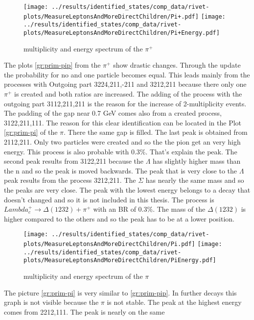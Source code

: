 \begin{figure}[h]
  \centering
  \texttt{[image: ../results/identified\_states/comp\_data/rivet-plots/MeasureLeptonsAndMoreDirectChildren/Pi+.pdf]}
  \texttt{[image: ../results/identified\_states/comp\_data/rivet-plots/MeasureLeptonsAndMoreDirectChildren/Pi+Energy.pdf]}
  \caption{multiplicity and energy spectrum of the \(\pi^+\)} \label{gr:prim-pip}
\end{figure}
The plots {\eqref{gr:prim-pip}} from the \(\pi^+\) show drastic changes. Through 
the update the probability for no and one particle becomes equal. This leads 
mainly from the processes with Outgoing part 3224,211,-211 and 3212,211 because 
there only one \(\pi^+\) is created and both ratios are increased. The adding 
of the process with the outgoing part 3112,211,211 is the reason for the 
increase of 2-multiplicity events. The padding of the gap near 0.7 GeV comes 
also from a created process, 3122,211,111. The reason for this clear identification 
can be located in the Plot {\eqref{gr:prim-pi}} of the \(\pi\). There the same gap 
is filled. The last peak is obtained from 2112,211. Only two particles were 
created and so the the pion get an very high energy. This process is also 
probable with \(0.3\%\). That's explain the peak. The second peak 
results from 3122,211 because the \(\Lambda\) has  slightly higher mass than 
the n and so the peak is moved backwards. The peak that is very close to the 
\(\Lambda\) peak results from the process 3212,211. The \(\Sigma\) has nearly 
the same mass and so the peaks are very close. The peak with the lowest 
energy belongs to a decay that doesn't changed and so it is not included in 
this thesis. The process is \(Lambda_c^+ \rightarrow \Delta(1232) + \pi^+\) 
with an BR of \(0.3 \%\). The mass of the \(\Delta(1232)\) is higher compared 
to the others and so the peak has to be at a lower position.
\begin{figure}[h]
  \centering
  \texttt{[image: ../results/identified\_states/comp\_data/rivet-plots/MeasureLeptonsAndMoreDirectChildren/Pi.pdf]}
  \texttt{[image: ../results/identified\_states/comp\_data/rivet-plots/MeasureLeptonsAndMoreDirectChildren/PiEnergy.pdf]}
  \caption{multiplicity and energy spectrum of the \(\pi\)} \label{gr:prim-pi}
\end{figure}
The picture {\eqref{gr:prim-pi}} is very similar to {\eqref{gr:prim-pip}}. In 
further decays this graph is not visible because the \(\pi\) is not stable.
The peak at the highest energy comes from 2212,111. The peak is nearly on the same 
